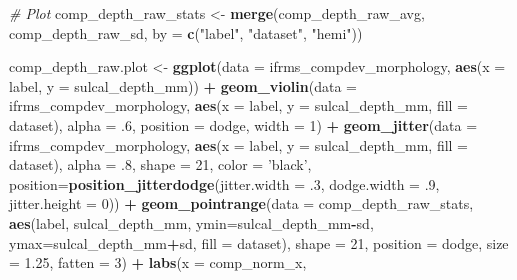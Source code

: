 \documentclass[
]{article}
\newenvironment{Shaded}{\begin{snugshade}}{\end{snugshade}}
\newcommand{\CommentTok}[1]{\textcolor[rgb]{0.56,0.35,0.01}{\textit{#1}}}
\newcommand{\DataTypeTok}[1]{\textcolor[rgb]{0.13,0.29,0.53}{#1}}
\newcommand{\DecValTok}[1]{\textcolor[rgb]{0.00,0.00,0.81}{#1}}
\newcommand{\FloatTok}[1]{\textcolor[rgb]{0.00,0.00,0.81}{#1}}
\newcommand{\KeywordTok}[1]{\textcolor[rgb]{0.13,0.29,0.53}{\textbf{#1}}}
\newcommand{\NormalTok}[1]{#1}
\newcommand{\OperatorTok}[1]{\textcolor[rgb]{0.81,0.36,0.00}{\textbf{#1}}}
\newcommand{\StringTok}[1]{\textcolor[rgb]{0.31,0.60,0.02}{#1}}
\begin{document}
\begin{Shaded}
\begin{Highlighting}[]
\CommentTok{# Plot}
\NormalTok{comp_depth_raw_stats <-}\StringTok{ }\KeywordTok{merge}\NormalTok{(comp_depth_raw_avg, comp_depth_raw_sd, }\DataTypeTok{by =} \KeywordTok{c}\NormalTok{(}\StringTok{"label"}\NormalTok{, }\StringTok{"dataset"}\NormalTok{, }\StringTok{"hemi"}\NormalTok{))}

\NormalTok{comp_depth_raw.plot <-}\StringTok{ }\KeywordTok{ggplot}\NormalTok{(}\DataTypeTok{data =}\NormalTok{ ifrms_compdev_morphology, }
                              \KeywordTok{aes}\NormalTok{(}\DataTypeTok{x =}\NormalTok{ label, }\DataTypeTok{y =}\NormalTok{ sulcal_depth_mm)) }\OperatorTok{+}
\StringTok{  }\KeywordTok{geom_violin}\NormalTok{(}\DataTypeTok{data =}\NormalTok{ ifrms_compdev_morphology, }
              \KeywordTok{aes}\NormalTok{(}\DataTypeTok{x =}\NormalTok{ label, }\DataTypeTok{y =}\NormalTok{ sulcal_depth_mm, }\DataTypeTok{fill =}\NormalTok{ dataset), }\DataTypeTok{alpha =} \FloatTok{.6}\NormalTok{, }\DataTypeTok{position =}\NormalTok{ dodge, }\DataTypeTok{width =} \DecValTok{1}\NormalTok{) }\OperatorTok{+}\StringTok{ }
\StringTok{  }\KeywordTok{geom_jitter}\NormalTok{(}\DataTypeTok{data =}\NormalTok{ ifrms_compdev_morphology, }
              \KeywordTok{aes}\NormalTok{(}\DataTypeTok{x =}\NormalTok{ label, }\DataTypeTok{y =}\NormalTok{ sulcal_depth_mm, }\DataTypeTok{fill =}\NormalTok{ dataset), }
              \DataTypeTok{alpha =} \FloatTok{.8}\NormalTok{, }\DataTypeTok{shape =} \DecValTok{21}\NormalTok{, }\DataTypeTok{color =} \StringTok{'black'}\NormalTok{,}
              \DataTypeTok{position=}\KeywordTok{position_jitterdodge}\NormalTok{(}\DataTypeTok{jitter.width =} \FloatTok{.3}\NormalTok{, }\DataTypeTok{dodge.width =} \FloatTok{.9}\NormalTok{, }\DataTypeTok{jitter.height =} \DecValTok{0}\NormalTok{)) }\OperatorTok{+}
\StringTok{  }\KeywordTok{geom_pointrange}\NormalTok{(}\DataTypeTok{data =}\NormalTok{ comp_depth_raw_stats, }
                  \KeywordTok{aes}\NormalTok{(label, sulcal_depth_mm, }\DataTypeTok{ymin=}\NormalTok{sulcal_depth_mm}\OperatorTok{-}\NormalTok{sd, }
                      \DataTypeTok{ymax=}\NormalTok{sulcal_depth_mm}\OperatorTok{+}\NormalTok{sd, }
                      \DataTypeTok{fill =}\NormalTok{ dataset), }
                  \DataTypeTok{shape =} \DecValTok{21}\NormalTok{, }\DataTypeTok{position =}\NormalTok{ dodge, }\DataTypeTok{size =} \FloatTok{1.25}\NormalTok{, }\DataTypeTok{fatten =} \DecValTok{3}\NormalTok{) }\OperatorTok{+}
\StringTok{  }\KeywordTok{labs}\NormalTok{(}\DataTypeTok{x =}\NormalTok{ comp_norm_x,}

\end{Highlighting}
\end{Shaded}
\end{document}
